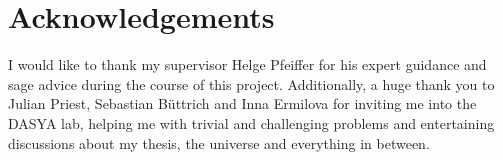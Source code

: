 \newpage
{}
\section*{Acknowledgements}
\label{sec:acknowledgements}
I would like to thank my supervisor Helge Pfeiffer for his expert guidance and sage advice during the course of this project. Additionally, a huge thank you to Julian Priest, Sebastian Büttrich and Inna Ermilova for inviting me into the DASYA lab, helping me with trivial and challenging problems and entertaining discussions about my thesis, the universe and everything in between.
\newpage